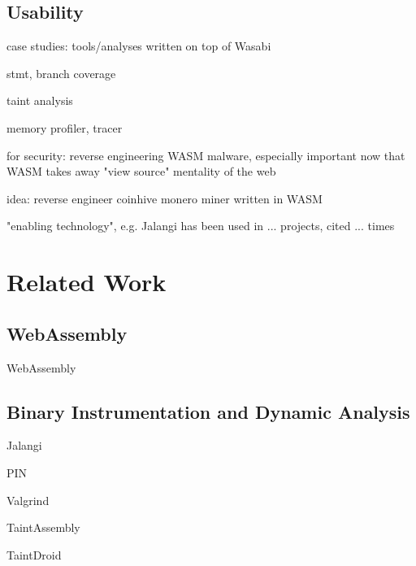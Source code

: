 \documentclass[sigplan,review,anonymous]{acmart}\settopmatter{printfolios=true,printccs=false,printacmref=false}
\newcommand{\name}{Wasabi}
\begin{document}
\subsection{Usability}
case studies: tools/analyses written on top of \name

stmt, branch coverage

taint analysis

memory profiler, tracer

for security: reverse engineering WASM malware, especially important now that WASM takes away "view source" mentality of the web

idea: reverse engineer coinhive monero miner written in WASM

"enabling technology", e.g. Jalangi has been used in ... projects, cited ... times

\newpage
\section{Related Work}

\subsection{WebAssembly}

WebAssembly \cite{Haas:2017:BWU:3062341.3062363}

\subsection{Binary Instrumentation and Dynamic Analysis}

Jalangi \cite{Sen:2013:JSR:2491411.2491447}

PIN \cite{Luk:2005:PBC:1065010.1065034}

Valgrind \cite{Nethercote:2007:VFH:1250734.1250746}

TaintAssembly \cite{2018arXiv180201050F}

TaintDroid \cite{Enck:2014:TIT:2642648.2619091}


\end{document}
